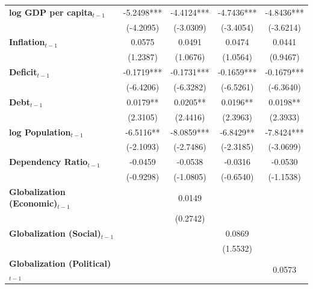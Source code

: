 \begin{center}
\begin{tabular}{lcccc}
\textbf{log GDP per capita$_{t-1}$}           &   -5.2498***   &    -4.4124***    &    -4.7436***    &    -4.8436***     \\
\textbf{ }                         &   (-4.2095)    &    (-3.0309)     &    (-3.4054)     &    (-3.6214)      \\
\textbf{Inflation$_{t-1}$}      &     0.0575     &      0.0491      &      0.0474      &      0.0441       \\
\textbf{ }                         &    (1.2387)    &     (1.0676)     &     (1.0564)     &     (0.9467)      \\
\textbf{Deficit$_{t-1}$}             &   -0.1719***   &    -0.1731***    &    -0.1659***    &    -0.1679***     \\
\textbf{ }                         &   (-6.4206)    &    (-6.3282)     &    (-6.5261)     &    (-6.3640)      \\
\textbf{Debt$_{t-1}$}                &    0.0179**    &     0.0205**     &     0.0196**     &     0.0198**      \\
\textbf{ }                         &    (2.3105)    &     (2.4416)     &     (2.3963)     &     (2.3933)      \\
\textbf{log Population$_{t-1}$}      &   -6.5116**    &    -8.0859***    &    -6.8429**     &    -7.8424***     \\
\textbf{ }                         &   (-2.1093)    &    (-2.7486)     &    (-2.3185)     &    (-3.0699)      \\
\textbf{Dependency Ratio$_{t-1}$}   &    -0.0459     &     -0.0538      &     -0.0316      &     -0.0530       \\
\textbf{ }                         &   (-0.9298)    &    (-1.0805)     &    (-0.6540)     &    (-1.1538)      \\
\textbf{Globalization (Economic)$_{t-1}$}             &                &      0.0149      &                  &                   \\
\textbf{ }                         &                &     (0.2742)     &                  &                   \\
\textbf{Globalization (Social)$_{t-1}$}             &                &                  &      0.0869      &                   \\
\textbf{ }                         &                &                  &     (1.5532)     &                   \\
\textbf{Globalization (Political)$_{t-1}$}             &                &                  &                  &      0.0573       \\

\end{tabular}
\end{center}
